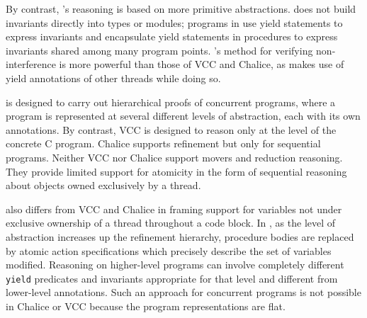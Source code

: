 By contrast, \civl's reasoning is based on more primitive abstractions.  \civl does not build invariants directly into types or modules; programs in \civl use yield statements to express invariants and encapsulate yield statements in procedures to express invariants shared among many program points. \civl's method for verifying non-interference is more powerful than those of VCC and Chalice, as \civl makes use of yield annotations of other threads while doing so. 

\civl is designed to carry out hierarchical proofs of concurrent programs, where a program is represented at several different levels of abstraction, each with its own annotations.  By contrast, VCC is designed to reason only at the level of the concrete C program. Chalice supports refinement but only for sequential programs. Neither VCC nor Chalice support movers and reduction reasoning. They provide limited support for atomicity in the form of sequential reasoning about objects owned exclusively by a thread. 

\civl also differs from VCC and Chalice in framing support for variables not under exclusive ownership of a thread throughout a code block. In \civl, as the level of abstraction increases up the refinement hierarchy, procedure bodies are replaced by atomic action specifications which precisely 
describe the set of variables modified. Reasoning on higher-level programs can involve completely different {\tt yield} predicates and invariants appropriate for that level and different from lower-level annotations. Such an approach for concurrent programs is not possible in Chalice or VCC because the program representations are flat.  

